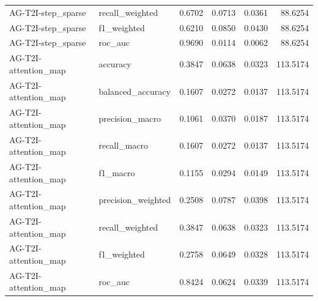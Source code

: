 \begin{tabular}{llrrrr}
AG-T2I-step_sparse & recall_weighted & 0.6702 & 0.0713 & 0.0361 & 88.6254 \\
AG-T2I-step_sparse & f1_weighted & 0.6210 & 0.0850 & 0.0430 & 88.6254 \\
AG-T2I-step_sparse & roc_auc & 0.9690 & 0.0114 & 0.0062 & 88.6254 \\
AG-T2I-attention_map & accuracy & 0.3847 & 0.0638 & 0.0323 & 113.5174 \\
AG-T2I-attention_map & balanced_accuracy & 0.1607 & 0.0272 & 0.0137 & 113.5174 \\
AG-T2I-attention_map & precision_macro & 0.1061 & 0.0370 & 0.0187 & 113.5174 \\
AG-T2I-attention_map & recall_macro & 0.1607 & 0.0272 & 0.0137 & 113.5174 \\
AG-T2I-attention_map & f1_macro & 0.1155 & 0.0294 & 0.0149 & 113.5174 \\
AG-T2I-attention_map & precision_weighted & 0.2508 & 0.0787 & 0.0398 & 113.5174 \\
AG-T2I-attention_map & recall_weighted & 0.3847 & 0.0638 & 0.0323 & 113.5174 \\
AG-T2I-attention_map & f1_weighted & 0.2758 & 0.0649 & 0.0328 & 113.5174 \\
AG-T2I-attention_map & roc_auc & 0.8424 & 0.0624 & 0.0339 & 113.5174 \\
\bottomrule
\end{tabular}
